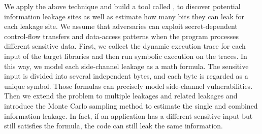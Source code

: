 We apply the above technique and build a tool called \tool{},
to discover potential information leakage sites as well as estimate how
many bits they can leak for each leakage site. We assume that adversaries can
exploit secret-dependent control-flow transfers and data-access patterns when
the program processes different sensitive data.
First, we collect the dynamic execution trace for each input of the target
libraries and then run symbolic execution on the traces. In this way, we model
each side-channel leakage as a math formula. The sensitive input is divided into
several independent bytes, and each byte is regarded as a unique symbol. Those
formulas can precisely model side-channel vulnerabilities. Then we extend the
problem to multiple leakages and related leakages and introduce the Monte Carlo
sampling method to estimate the single and combined information leakage. In
fact, if an application has a different sensitive input but still satisfies
the formula, the code can still leak the same information.





